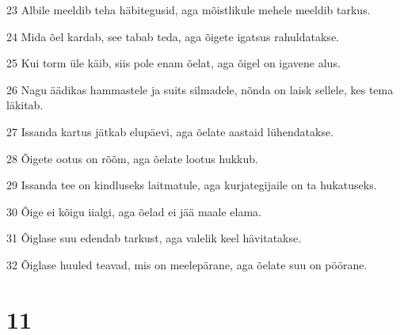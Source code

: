 \par 23 Albile meeldib teha häbitegusid, aga mõistlikule mehele meeldib tarkus.
\par 24 Mida õel kardab, see tabab teda, aga õigete igatsus rahuldatakse.
\par 25 Kui torm üle käib, siis pole enam õelat, aga õigel on igavene alus.
\par 26 Nagu äädikas hammastele ja suits silmadele, nõnda on laisk sellele, kes tema läkitab.
\par 27 Issanda kartus jätkab elupäevi, aga õelate aastaid lühendatakse.
\par 28 Õigete ootus on rõõm, aga õelate lootus hukkub.
\par 29 Issanda tee on kindluseks laitmatule, aga kurjategijaile on ta hukatuseks.
\par 30 Õige ei kõigu iialgi, aga õelad ei jää maale elama.
\par 31 Õiglase suu edendab tarkust, aga valelik keel hävitatakse.
\par 32 Õiglase huuled teavad, mis on meelepärane, aga õelate suu on pöörane.

\chapter{11}

